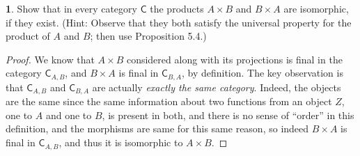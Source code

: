 \documentclass{article}
\theoremstyle{definition}
\newtheorem{ex}{}[section]
\begin{document}
\begin{ex}
	Show that in every category $\mathsf{C}$ the products $A \times B$ and $B \times A$ are isomorphic, if they exist.
	(Hint: Observe that they both satisfy the universal property for the product of $A$ and $B$; then use Proposition 5.4.)
\end{ex}
\begin{proof}
	We know that $A \times B$ considered along with its projections is final in the category $\mathsf{C}_{A,B}$, and $B \times A$ is final in $\mathsf{C}_{B,A}$, by definition.
	The key observation is that $\mathsf{C}_{A,B}$ and $\mathsf{C}_{B,A}$ are actually \textit{exactly the same category}.
	Indeed, the objects are the same since the same information about two functions from an object $Z$, one to $A$ and one to $B$, is present in both, and there is no sense of ``order'' in this definition, and the morphisms are same for this same reason, so indeed $B \times A$ is final in $\mathsf{C}_{A,B}$, and thus it is isomorphic to $A \times B$.
\end{proof}
\end{document}
